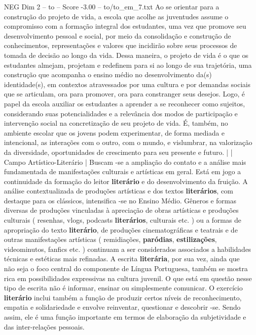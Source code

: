 \begin{textsample}{NEG Dim 2 – to – Score -3.00 – to/to\_em\_7.txt}
Ao se orientar para a construção do projeto de vida, a escola que acolhe as juventudes assume o compromisso com a formação integral dos estudantes, uma vez que promove seu desenvolvimento pessoal e social, por meio da consolidação e construção de conhecimentos, representações e valores que incidirão sobre seus processos de tomada de decisão ao longo da vida.
Dessa maneira, o projeto de vida é o que os estudantes almejam, projetam e redefinem para si ao longo de sua trajetória, uma construção que acompanha o ensino médio no desenvolvimento da(s) identidade(s), em contextos atravessados por uma cultura e por demandas sociais que se articulam, ora para promover, ora para constranger seus desejos.
Logo, é papel da escola auxiliar os estudantes a aprender a se reconhecer como sujeitos, considerando suas potencialidades e a relevância dos modos de participação e intervenção social na concretização de seu projeto de vida.
É, também, no ambiente escolar que os jovens podem experimentar, de forma mediada e intencional, as interações com o outro, com o mundo, e vislumbrar, na valorização da diversidade, oportunidades de crescimento para seu presente e futuro. | | Campo Artístico-Literário | Buscam -se a ampliação do contato e a análise mais fundamentada de manifestações culturais e artísticas em geral.
Está em jogo a continuidade da formação do leitor \textbf{literário} e do desenvolvimento da fruição.
A análise contextualizada de produções artísticas e dos textos \textbf{literários}, com destaque para os clássicos, intensifica -se no Ensino Médio.
Gêneros e formas diversas de produções vinculadas à apreciação de obras artísticas e produções culturais ( resenhas, vlogs, podcasts \textbf{literários}, culturais etc. ) ou a formas de apropriação do texto \textbf{literário}, de produções cinematográficas e teatrais e de outras manifestações artísticas ( remidiações, \textbf{paródias}, \textbf{estilizações}, videominutos, fanfics etc. ) continuam a ser considerados associados a habilidades técnicas e estéticas mais refinadas.
A escrita \textbf{literária}, por sua vez, ainda que não seja o foco central do componente de Língua Portuguesa, também se mostra rica em possibilidades expressivas na cultura juvenil.
O que está em questão nesse tipo de escrita não é informar, ensinar ou simplesmente comunicar.
O exercício \textbf{literário} inclui também a função de produzir certos níveis de reconhecimento, empatia e solidariedade e envolve reinventar, questionar e descobrir -se.
Sendo assim, ele é uma função importante em termos de elaboração da subjetividade e das inter-relações pessoais.

\end{textsample}
